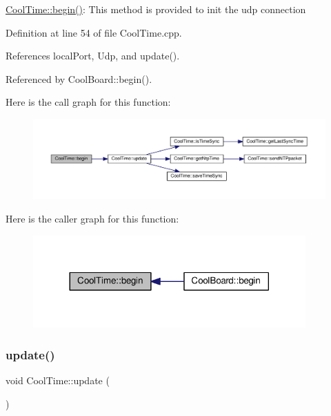 \hyperlink{class_cool_time_ab1976cf718b950bc31e003c3323b8adb}{Cool\+Time\+::begin()}\+: This method is provided to init the udp connection 

Definition at line 54 of file Cool\+Time.\+cpp.



References local\+Port, Udp, and update().



Referenced by Cool\+Board\+::begin().

Here is the call graph for this function\+:\nopagebreak
\begin{figure}[H]
\begin{center}
\leavevmode
\includegraphics[width=350pt]{d6/d49/class_cool_time_ab1976cf718b950bc31e003c3323b8adb_cgraph}
\end{center}
\end{figure}
Here is the caller graph for this function\+:\nopagebreak
\begin{figure}[H]
\begin{center}
\leavevmode
\includegraphics[width=296pt]{d6/d49/class_cool_time_ab1976cf718b950bc31e003c3323b8adb_icgraph}
\end{center}
\end{figure}
\mbox{\label{class_cool_time_aae601f795452cfa48d9fb337aed483a8}} 
\subsubsection{\texorpdfstring{update()}{update()}}
{\footnotesize\ttfamily void Cool\+Time\+::update (\begin{DoxyParamCaption}{ }\end{DoxyParamCaption})}

